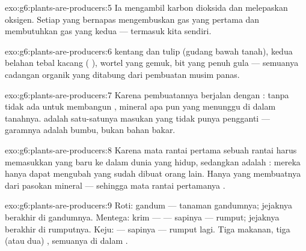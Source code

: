 \begin{solution}{exo:g6:plants-are-producers:5}
Ia mengambil karbon dioksida dan melepaskan oksigen. Setiap  yang bernapas mengembuskan gas yang pertama dan membutuhkan gas
yang kedua --- termasuk kita sendiri.
\end{solution}

\begin{solution}{exo:g6:plants-are-producers:6}
 kentang dan  tulip (gudang bawah tanah), kedua
belahan tebal kacang ( ),  wortel yang
gemuk,  bit yang penuh gula --- semuanya cadangan organik yang
ditabung dari pembuatan musim panas.
\end{solution}

\begin{solution}{exo:g6:plants-are-producers:7}
Karena pembuatannya berjalan dengan : tanpa  tidak ada
 untuk membangun , mineral apa pun yang menunggu
di dalam tanahnya.  adalah satu-satunya masukan yang tidak punya
pengganti --- garamnya adalah bumbu, bukan bahan bakar.
\end{solution}

\begin{solution}{exo:g6:plants-are-producers:8}
Karena mata rantai pertama sebuah rantai harus memasukkan  yang baru ke dalam dunia yang hidup, sedangkan  adalah
: mereka hanya dapat mengubah  yang sudah dibuat
orang lain. Hanya  yang membuatnya dari pasokan mineral ---
sehingga mata rantai pertamanya .
\end{solution}

\begin{solution}{exo:g6:plants-are-producers:9}
Roti: gandum ---  tanaman gandumnya; jejaknya berakhir di 
gandumnya. Mentega: krim ---  --- sapinya --- rumput; jejaknya
berakhir di  rumputnya. Keju:  --- sapinya --- rumput lagi.
Tiga makanan, tiga (atau dua) , semuanya di dalam .
\end{solution}

